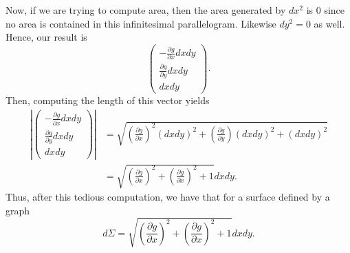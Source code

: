                                     Now, if we are trying to compute area, then the area generated by $dx^2$ is 0 since no area is contained in this infinitesimal parallelogram. Likewise $dy^2=0$ as well. Hence, our result is
                                    \[
                                    \begin{pmatrix} -\frac{\partial g}{\partial x} dxdy \\ \frac{\partial g}{\partial y} dxdy \\ dxdy \end{pmatrix}.
                                    \]
                                    Then, computing the length of this vector yields
                                     \begin{align*}
                                     \left| \begin{pmatrix} -\frac{\partial g}{\partial x} dxdy \\ \frac{\partial g}{\partial y} dxdy \\ dxdy \end{pmatrix}\right| &= \sqrt{ \left( \frac{\partial g}{\partial x}  \right)^2 (dxdy)^2 + \left( \frac{\partial g}{\partial y} \right) (dxdy)^2 + (dxdy)^2}\\
                                     &= \sqrt{\left(\frac{\partial g}{\partial x} \right)^2 + \left( \frac{\partial g}{\partial x}  \right)^2 +1 } dxdy.
                					\end{align*}
                					Thus, after this tedious computation, we have that for a surface defined by a graph 
                					\[
                					d\Sigma = \sqrt{\left(\frac{\partial g}{\partial x} \right)^2 + \left( \frac{\partial g}{\partial x}  \right)^2 +1 } dxdy.
                					\]
                                     

